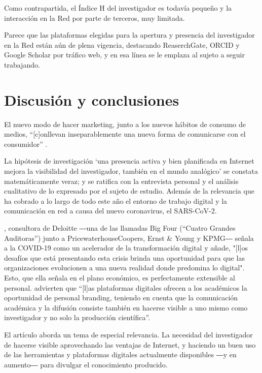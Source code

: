 \documentclass{textolivre}
\begin{document}
Como contrapartida, el Índice H del investigador es todavía pequeño y la interacción en la Red por parte de terceros, muy limitada.

Parece que las plataformas elegidas para la apertura y presencia del investigador en la Red están aún de plena vigencia, destacando ReaserchGate, ORCID y Google Scholar por tráfico web, y en esa línea se le emplaza al sujeto a seguir trabajando.

\section{Discusión y conclusiones}\label{sec-discussao}
El nuevo modo de hacer marketing, junto a los nuevos hábitos de consumo de medios, “[c]onllevan inseparablemente una nueva forma de comunicarse con el consumidor” \cite[p. 14]{banos_gonzalez_comunicaciones_2017}. 

La hipótesis de investigación ‘una presencia activa y bien planificada en Internet mejora la visibilidad del investigador, también en el mundo analógico’ se constata matemáticamente veraz; y se ratifica con la entrevista personal y el análisis cualitativo de lo expresado por el sujeto de estudio. Además de la relevancia que ha cobrado a lo largo de todo este año el entorno de trabajo digital y la comunicación en red a causa del nuevo coronavirus, el SARS-CoV-2. 

\textcite[p. 71]{zelada_covid-19_2021}, consultora de Deloitte ―una de las llamadas Big Four (``Cuatro Grandes Auditoras'') junto a PricewaterhouseCoopers, Ernst \& Young y KPMG― señala a la COVID-19 como un acelerador de la transformación digital y añade, "[l]os desafíos que está presentando esta crisis brinda una oportunidad para que las organizaciones evolucionen a una nueva realidad donde predomina lo digital". Esto, que ella señala en el plano económico, es perfectamente extensible al personal. 
\textcite{siso_calvo_plataformas_2020} advierten que ``[l]as plataformas digitales ofrecen a los académicos la oportunidad de personal branding, teniendo en cuenta que la comunicación académica y la difusión consiste también en hacerse visible a uno mismo como investigador y no solo la producción científica''. 

El artículo aborda un tema de especial relevancia. La necesidad del investigador de hacerse visible aprovechando las ventajas de Internet, y haciendo un buen uso de las herramientas y plataformas digitales actualmente disponibles ―y en aumento― para divulgar el conocimiento producido. 
\end{document}
